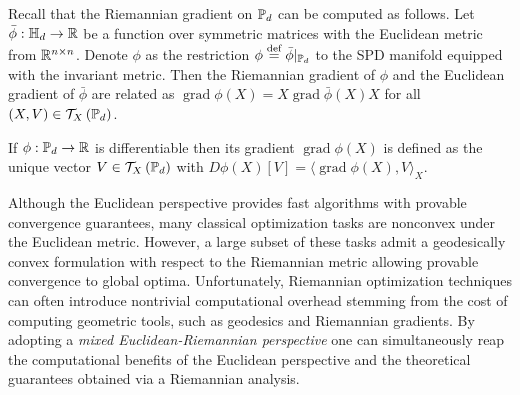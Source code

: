\documentclass[sn-nature]{sn-jnl}%
\theoremstyle{thmstyleone}%
\theoremstyle{thmstyletwo}%
\theoremstyle{thmstylethree}%
\begin{document}


 Recall that the Riemannian gradient on $\mathbb{P}_d$ can be computed as follows. Let $\bar{\phi}: \mathbb{H}_d \to \mathbb{R}$ be a function over symmetric matrices with the Euclidean metric from $\mathbb{R}^{n \times n}$. Denote $\phi$ as the restriction $\phi \stackrel{\text{def}}{=} \bar{\phi}\vert_{\mathbb{P}_d}$ to the SPD manifold equipped with the invariant metric. Then the Riemannian gradient of $\phi$ and the Euclidean gradient of $\bar{\phi}$ are related as
$\operatorname{grad}\phi(X) = X \operatorname{grad}\bar{\phi}(X)X$ for all $(X,V) \in \mathcal{T}_X\left(\mathbb{P}_d\right)$.\\


\begin{definition}
    If $\phi: \mathbb{P}_d \to \mathbb{R}$ is differentiable then its gradient $\operatorname{grad} \phi(X)$ is defined as the unique vector $V \in \mathcal{T}_X \left(\mathbb{P}_d\right)$ with $D\phi(X) [V] = \langle \operatorname{grad}\phi(X), V \rangle_X$.\\
\end{definition}

Although the Euclidean perspective provides fast algorithms with provable convergence guarantees, many classical optimization tasks are nonconvex under the Euclidean metric. However, a large subset of these tasks admit a geodesically convex formulation with respect to the Riemannian metric allowing provable convergence to global optima. Unfortunately, Riemannian optimization techniques can often introduce nontrivial computational overhead stemming from the cost of computing geometric tools, such as geodesics and Riemannian gradients. By adopting a \textit{mixed Euclidean-Riemannian perspective} one can simultaneously reap the computational benefits of the Euclidean perspective and the theoretical guarantees obtained via a Riemannian analysis. 
\end{document}
